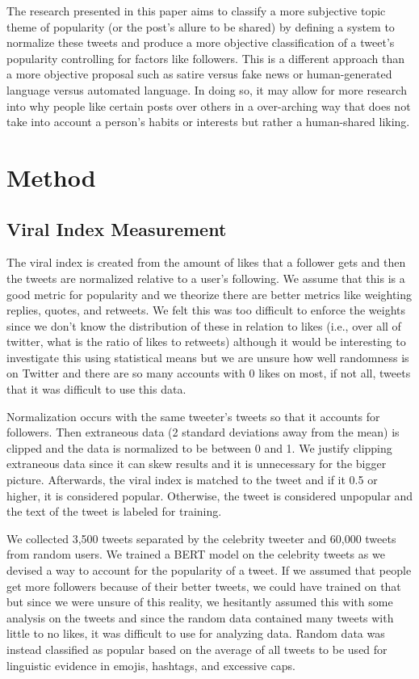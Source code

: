 \documentclass{article}
\begin{document}
The research presented in this paper aims to classify a more subjective topic theme of popularity (or the post's allure to be shared) by defining a system to normalize these tweets and produce a more objective 
classification of a tweet's popularity controlling for factors like followers. This is a different approach than a more objective proposal such as satire versus fake news or human-generated language 
versus automated language. In doing so, it may allow for more research into why people like certain posts over others in a over-arching way that does not take into account a person's habits or interests but 
rather a human-shared liking. 

\section{Method}

\subsection{Viral Index Measurement}
The viral index is created from the amount of likes that a follower gets and then the tweets are normalized relative to a user's following.
We assume that this is a good metric for popularity and we theorize there are better metrics like weighting replies, quotes, and retweets.
We felt this was too difficult to enforce the weights since we don't know the distribution of these in relation to likes (i.e., over all of twitter, what is the ratio of likes to retweets) although it would be interesting to investigate this using statistical means but we are unsure how well randomness is on Twitter and there are so many accounts with 0 likes on most, if not all, tweets that it was difficult to use this data.

Normalization occurs with the same tweeter's tweets so that it accounts for followers. Then extraneous data (2 standard deviations away from the mean) is clipped and the data is normalized to be between 0 and 1. 
We justify clipping extraneous data since it can skew results and it is unnecessary for the bigger picture. 
Afterwards, the viral index is matched to the tweet and if it 0.5 or higher, it is considered popular. Otherwise, the tweet is considered unpopular and the text of the tweet is labeled for training. 

We collected 3,500 tweets separated by the celebrity tweeter and 60,000 tweets from random users.
We trained a BERT model on the celebrity tweets as we devised a way to account for the popularity of a tweet. 
If we assumed that people get more followers because of their better tweets, we could have trained on that but since we were unsure of this reality, we hesitantly assumed this with some analysis on the tweets and
since the random data contained many tweets with little to no likes, it was difficult to use for analyzing data.
Random data was instead classified as popular based on the average of all tweets to be used for linguistic evidence in emojis, hashtags, and excessive caps.
\end{document}
